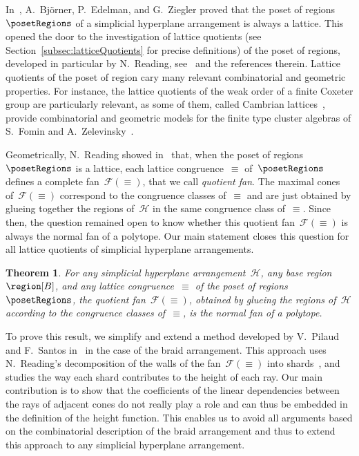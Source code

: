 \documentclass{amsart}
\newtheorem{theorem}{Theorem}%
\theoremstyle{definition}
\newcommand{\darkblue}{\color{darkblue}} %
\newcommand{\defn}[1]{\textsl{\darkblue #1}} %
\newcommand{\arrangement}{\mathcal{H}} %
\newcommand{\fanEquiv}{\mathcal{F}(\equiv)} %
\begin{document}
In~\cite{BjornerEdelmanZiegler}, A.~Bj\"orner, P.~Edelman, and G.~Ziegler proved that the poset of regions~$\posetRegions$ of a simplicial hyperplane arrangement is always a lattice.
This opened the door to the investigation of lattice quotients (see Section~\ref{subsec:latticeQuotients} for precise definitions) of the poset of regions, developed in particular by N.~Reading, see~\cite{Reading-PosetRegionsChapter} and the references therein.
Lattice quotients of the poset of region cary many relevant combinatorial and geometric properties.
For instance, the lattice quotients of the weak order of a finite Coxeter group are particularly relevant, as some of them, called Cambrian lattices~\cite{Reading-CambrianLattices}, provide combinatorial and geometric models for the finite type cluster algebras of S.~Fomin and A.~Zelevinsky~\cite{FominZelevinsky-ClusterAlgebrasII}.

Geometrically, N.~Reading showed in~\cite{Reading-HopfAlgebras} that, when the poset of regions~$\posetRegions$ is a lattice, each lattice congruence~$\equiv$ of~$\posetRegions$ defines a complete fan~$\fanEquiv$, that we call \defn{quotient fan}.
The maximal cones of~$\fanEquiv$ correspond to the congruence classes of~$\equiv$ and are just obtained by glueing together the regions of~$\arrangement$ in the same congruence class of~$\equiv$.
Since then, the question remained open to know whether this quotient fan~$\fanEquiv$ is always the normal fan of a polytope.
Our main statement closes this question for all lattice quotients of simplicial hyperplane arrangements.

\begin{theorem}
\label{thm:quotientopes}
For any simplicial hyperplane arrangement~$\arrangement$, any base region~$\region[B]$, and any lattice congruence~$\equiv$ of the poset of regions~$\posetRegions$, the quotient fan~$\fanEquiv$, obtained by glueing the regions of~$\arrangement$ according to the congruence classes of~$\equiv$, is the normal fan of a polytope.
\end{theorem}

To prove this result, we simplify and extend a method developed by V.~Pilaud and F.~Santos in~\cite{PilaudSantos-quotientopes} in the case of the braid arrangement.
This approach uses N.~Reading's decomposition of the walls of the fan~$\fanEquiv$ into shards~\cite[Sect.~10.5]{Reading-FiniteCoxeterGroupsChapter}, and studies the way each shard contributes to the height of each ray.
Our main contribution is to show that the coefficients of the linear dependencies between the rays of adjacent cones do not really play a role and can thus be embedded in the definition of the height function.
This enables us to avoid all arguments based on the combinatorial description of the braid arrangement and thus to extend this approach to any simplicial hyperplane arrangement.
\end{document}

